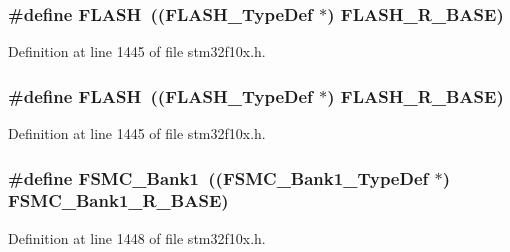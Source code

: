 \subsubsection[{\texorpdfstring{F\+L\+A\+SH}{FLASH}}]{\setlength{\rightskip}{0pt plus 5cm}\#define F\+L\+A\+SH~(({\bf F\+L\+A\+S\+H\+\_\+\+Type\+Def} $\ast$) {\bf F\+L\+A\+S\+H\+\_\+\+R\+\_\+\+B\+A\+SE})}\hypertarget{group___peripheral__declaration_ga844ea28ba1e0a5a0e497f16b61ea306b}{}\label{group___peripheral__declaration_ga844ea28ba1e0a5a0e497f16b61ea306b}


Definition at line 1445 of file stm32f10x.\+h.

\subsubsection[{\texorpdfstring{F\+L\+A\+SH}{FLASH}}]{\setlength{\rightskip}{0pt plus 5cm}\#define F\+L\+A\+SH~(({\bf F\+L\+A\+S\+H\+\_\+\+Type\+Def} $\ast$) {\bf F\+L\+A\+S\+H\+\_\+\+R\+\_\+\+B\+A\+SE})}\hypertarget{group___peripheral__declaration_ga844ea28ba1e0a5a0e497f16b61ea306b}{}\label{group___peripheral__declaration_ga844ea28ba1e0a5a0e497f16b61ea306b}


Definition at line 1445 of file stm32f10x.\+h.

\subsubsection[{\texorpdfstring{F\+S\+M\+C\+\_\+\+Bank1}{FSMC_Bank1}}]{\setlength{\rightskip}{0pt plus 5cm}\#define F\+S\+M\+C\+\_\+\+Bank1~(({\bf F\+S\+M\+C\+\_\+\+Bank1\+\_\+\+Type\+Def} $\ast$) {\bf F\+S\+M\+C\+\_\+\+Bank1\+\_\+\+R\+\_\+\+B\+A\+SE})}\hypertarget{group___peripheral__declaration_ga2a759bad07fe730c99f9e1490e646220}{}\label{group___peripheral__declaration_ga2a759bad07fe730c99f9e1490e646220}


Definition at line 1448 of file stm32f10x.\+h.

